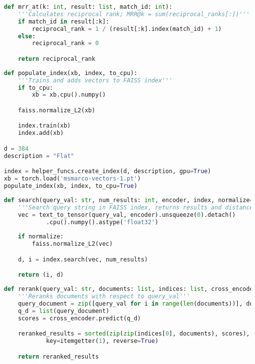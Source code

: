 \begin{lstlisting}[language=Python, caption=Sposób obliczania MRR]
def mrr_at(k: int, result: list, match_id: int):
    '''Calculates reciprocal rank; MRR@k = sum(reciprocal_ranks[:])'''
    if match_id in result[:k]:        
        reciprocal_rank = 1 / (result[:k].index(match_id) + 1)
    else:
        reciprocal_rank = 0

    return reciprocal_rank
\end{lstlisting}

\newpage

\begin{lstlisting}[language=Python, caption=Dodawanie rekordów do indeksu]
def populate_index(xb, index, to_cpu):
    '''Trains and adds vectors to FAISS index'''
    if to_cpu:
        xb = xb.cpu().numpy()

    faiss.normalize_L2(xb)

    index.train(xb)
    index.add(xb)

d = 384
description = "Flat"

index = helper_funcs.create_index(d, description, gpu=True)
xb = torch.load('msmarco-vectors-1.pt')
populate_index(xb, index, to_cpu=True)
\end{lstlisting}

\begin{lstlisting}[language=Python, caption=Wyszukiwanie zasobów]
def search(query_val: str, num_results: int, encoder, index, normalize=True):
    '''Search query string in FAISS index, returns results and distances'''
    vec = text_to_tensor(query_val, encoder).unsqueeze(0).detach()
            .cpu().numpy().astype('float32')
    
    if normalize:
        faiss.normalize_L2(vec)

    d, i = index.search(vec, num_results)

    return (i, d)
\end{lstlisting}

\begin{lstlisting}[language=Python, caption=Ponowny ranking]
def rerank(query_val: str, documents: list, indices: list, cross_encoder):
    '''Reranks documents with respect to query_val'''
    query_document = zip([query_val for i in range(len(documents))], documents)
    q_d = list(query_document)
    scores = cross_encoder.predict(q_d)

    reranked_results = sorted(zip(zip(indices[0], documents), scores),
            key=itemgetter(1), reverse=True)

    return reranked_results
\end{lstlisting}
